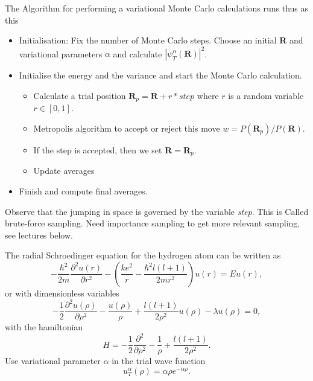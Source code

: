 \documentclass[graybox,sectrefs,envcountresetchap,open=right]{svmonodo}
\begin{document}
The Algorithm for performing a variational Monte Carlo calculations runs thus as this

\begin{itemize}
   \item Initialisation: Fix the number of Monte Carlo steps. Choose an initial $\bm{R}$ and variational parameters $\alpha$ and calculate $\left|\psi_T^{\alpha}(\bm{R})\right|^2$. 

   \item Initialise the energy and the variance and start the Monte Carlo calculation.
\begin{itemize}

      \item Calculate  a trial position  $\bm{R}_p=\bm{R}+r*step$ where $r$ is a random variable $r \in [0,1]$.

      \item Metropolis algorithm to accept or reject this move  $w = P(\bm{R}_p)/P(\bm{R})$.

      \item If the step is accepted, then we set $\bm{R}=\bm{R}_p$. 

      \item Update averages

\end{itemize}

\noindent
   \item Finish and compute final averages.
\end{itemize}

\noindent
Observe that the jumping in space is governed by the variable \emph{step}. This is Called brute-force sampling.
Need importance sampling to get more relevant sampling, see lectures below.



The radial Schroedinger equation for the hydrogen atom can be
written as
\[
-\frac{\hbar^2}{2m}\frac{\partial^2 u(r)}{\partial r^2}-
\left(\frac{ke^2}{r}-\frac{\hbar^2l(l+1)}{2mr^2}\right)u(r)=Eu(r),
\]
or with dimensionless variables
\[
-\frac{1}{2}\frac{\partial^2 u(\rho)}{\partial \rho^2}-
\frac{u(\rho)}{\rho}+\frac{l(l+1)}{2\rho^2}u(\rho)-\lambda u(\rho)=0,
\label{eq:hydrodimless1}
\]
with the hamiltonian
\[
H=-\frac{1}{2}\frac{\partial^2 }{\partial \rho^2}-
\frac{1}{\rho}+\frac{l(l+1)}{2\rho^2}.
\]
Use variational parameter $\alpha$ in the trial
wave function 
\[
   u_T^{\alpha}(\rho)=\alpha\rho e^{-\alpha\rho}. 
   \label{eq:trialhydrogen}
\]
\end{document}
